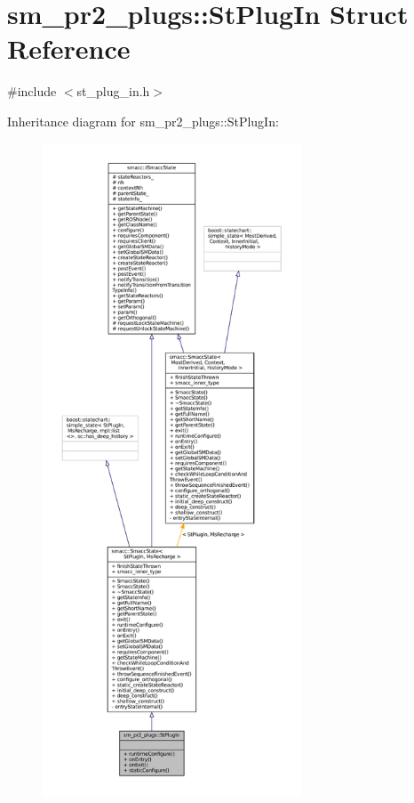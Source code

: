 \hypertarget{structsm__pr2__plugs_1_1StPlugIn}{}\section{sm\+\_\+pr2\+\_\+plugs\+:\+:St\+Plug\+In Struct Reference}
\label{structsm__pr2__plugs_1_1StPlugIn}


{\ttfamily \#include $<$st\+\_\+plug\+\_\+in.\+h$>$}



Inheritance diagram for sm\+\_\+pr2\+\_\+plugs\+:\+:St\+Plug\+In\+:
\nopagebreak
\begin{figure}[H]
\begin{center}
\leavevmode
\includegraphics[height=550pt]{structsm__pr2__plugs_1_1StPlugIn__inherit__graph}
\end{center}
\end{figure}


